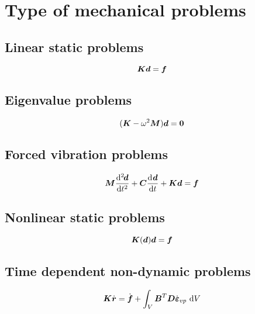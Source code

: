 \chapter{Type of mechanical problems}

\section{Linear static problems}
\begin{equation}
\mbf{K} \mbf{d} = \mbf{f}
\end{equation}
\section{Eigenvalue problems}
\begin{equation}
(\mbf{K}-\omega^2\mbf{M})\mbf{d}=\mbf{0}
\end{equation}
\section{Forced vibration problems}
\begin{equation}
\mbf{M}\nod{2}{\mbf{d}}{t} + \mbf{C}\od{\mbf{d}}{t} + \mbf{K}\mbf{d} = \mbf{f}
\end{equation}
\section{Nonlinear static problems}
\begin{equation}\label{eqnnonlinstat}
\mbf{K}(\mbf{d}) \mbf{d} = \mbf{f}
\end{equation}
\section{Time dependent non-dynamic problems}
\begin{equation}
\mbf{K} \dot{\mbf{r}} = \dot{\mbf{f}} +
\int_{V} \mbf{B}^T \mbf{D} \dot{\mbf{\varepsilon}}_{vp}\ {\rm d}V
\end{equation}
